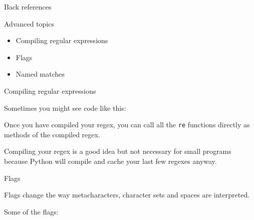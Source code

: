 \documentclass{beamer}
\begin{document}
\begin{frame}{Back references}


\end{frame}

\begin{frame}{Advanced topics}

\begin{itemize}
 \item Compiling regular expressions
 \item Flags
 \item Named matches
\end{itemize}

\end{frame}

\begin{frame}{Compiling regular expressions}

Sometimes you might see code like this:



{\small Once you have compiled your regex, you can call all the \lstinline$re$ functions
directly as methods of the compiled regex. }

\bigskip

{\small Compiling your regex is a good idea but not necessary for small
programs because Python will compile and cache your last few regexes anyway.}

\end{frame}

\begin{frame}{Flags}

Flags change the way metacharacters, character sets and spaces are interpreted.

\bigskip

Some of the flags:

\end{frame}
\end{document}
